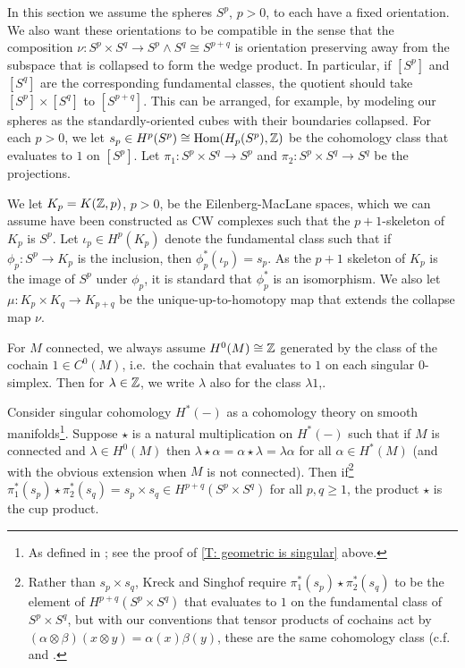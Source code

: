 In this section we assume the spheres $S^p$, $p>0$, to each have a fixed orientation.
We also want these orientations to be compatible in the sense that the composition $\nu \colon S^p \times S^q \to S^p \wedge S^q \cong S^{p+q}$ is orientation preserving away from the subspace that is collapsed to form the wedge product.
In particular, if $[S^p]$ and $[S^q]$ are the corresponding fundamental classes, the quotient should take $[S^p] \times [S^q]$ to $[S^{p+q}]$.
This can be arranged, for example, by modeling our spheres as the standardly-oriented cubes with their boundaries collapsed.
For each $p>0$, we let $s_p \in H^p(S^p) \cong \textup{Hom}(H_p(S^p), \mathbb{Z})$ be the cohomology class that evaluates to $1$ on $[S^p]$.
Let $\pi_1 \colon S^p \times S^q \to S^p$ and $\pi_2 \colon S^p \times S^q \to S^q$ be the projections.

We let $K_p = K(\mathbb{Z},p)$, $p>0$, be the Eilenberg-MacLane spaces, which we can assume have been constructed as CW complexes such that the $p+1$-skeleton of $K_p$ is $S^p$.
Let $\iota_p \in H^p(K_p)$ denote the fundamental class such that if $\phi_p \colon S^p \to K_p$ is the inclusion, then $\phi_p^*(\iota_p) = s_p$.
As the $p+1$ skeleton of $K_p$ is the image of $S^p$ under $\phi_p$, it is standard that $\phi_p^*$ is an isomorphism.
We also let $\mu \colon K_p \times K_q \to K_{p+q}$ be the unique-up-to-homotopy map that extends the collapse map $\nu$.

For $M$ connected, we always assume $H^0(M) \cong \mathbb{Z}$ generated by the class of the cochain $1 \in C^0(M)$,  i.e.\ the cochain that evaluates to $1$ on each singular $0$-simplex.
Then for $\lambda \in \mathbb{Z}$, we write $\lambda$ also for the class $\lambda 1$,.

\begin{proposition}\label{P: Kreck-Singhof pairing}
	Consider singular cohomology $H^*(-)$ as a cohomology theory on smooth manifolds\footnote{As defined in \cite{Krec10b}; see the proof of \cref{T: geometric is singular} above.}.
	Suppose $\star$ is a natural multiplication on $H^*(-)$ such that if $M$ is connected and $\lambda \in H^0(M)$ then $\lambda\star \alpha = \alpha\star \lambda = \lambda\alpha$ for all $\alpha \in H^*(M)$ (and with the obvious extension when $M$ is not connected).
	Then if\footnote{Rather than $s_p \times s_q$, Kreck and Singhof require $\pi_1^*(s_p) \star \pi_2^*(s_q)$ to be the element of $H^{p+q}(S^p \times S^q)$ that evaluates to $1$ on the fundamental class of $S^p \times S^q$, but with our conventions that tensor products of cochains act by $(\alpha \otimes \beta)(x \otimes y) = \alpha(x)\beta(y)$, these are the same cohomology class (c.f.\ \cite[page 245]{Span81} and \cite[Section 3B]{Hatc02}.
	} $\pi_1^*(s_p) \star \pi_2^*(s_q) = s_p \times s_q \in H^{p+q}(S^p \times S^q)$ for all $p,q\geq 1$, the product $\star$ is the cup product.
\end{proposition}

